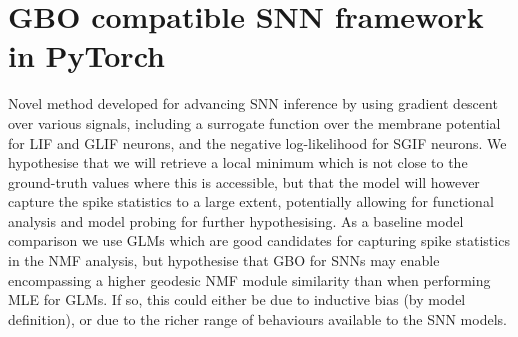 \documentclass[mphil,deptreport,ianc]{infthesis} %
\begin{document}
\section{GBO compatible SNN framework in PyTorch}


Novel method developed for advancing SNN inference by using gradient descent over various signals, including a surrogate function over the membrane potential for LIF and GLIF neurons, and the negative log-likelihood for SGIF neurons.
We hypothesise that we will retrieve a local minimum which is not close to the ground-truth values where this is accessible, but that the model will however capture the spike statistics to a large extent, potentially allowing for functional analysis and model probing for further hypothesising. 
As a baseline model comparison we use GLMs which are good candidates for capturing spike statistics in the NMF analysis, but hypothesise that GBO for SNNs may enable encompassing a higher geodesic NMF module similarity than when performing MLE for GLMs.
If so, this could either be due to inductive bias (by model definition), or due to the richer range of behaviours available to the SNN models.

\end{document}
